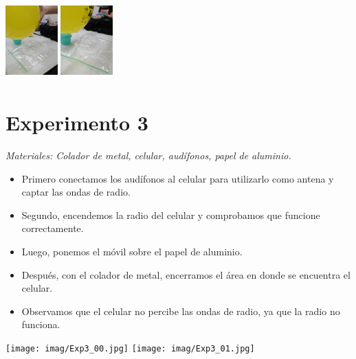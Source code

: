 \documentclass[]{article}
\newenvironment{Figura}
  {\par\medskip\noindent\minipage{\linewidth}}
  {\endminipage\par\medskip}
\begin{document}
\begin{multicols*}{2}
\begin{Figura}
    \centering
    \includegraphics[width=2cm, height=3cm]{imag/Exp2_03.jpg}
    \includegraphics[width=2cm, height=3cm]{imag/Exp2_04.jpg}
\end{Figura}   





    
\section*{Experimento 3}
\textit{Materiales: Colador de metal, celular, audífonos, papel de aluminio.}
\vspace{-\topsep}
    \begin{itemize}
       \setlength{\parskip}{0pt} 
       \setlength{\itemsep}{0pt plus 1pt}
        \item Primero conectamos los audífonos al celular para utilizarlo como antena y captar las ondas de radio.
        \item Segundo, encendemos la radio del celular y comprobamos que funcione correctamente.
        \item Luego, ponemos el móvil sobre el papel de aluminio.
        \item Después, con el colador de metal, encerramos el área en donde se encuentra el celular.
        \item Observamos que el celular no percibe las ondas de radio, ya que la radio no funciona.
    \end{itemize}
\vspace{-\topsep}

\begin{Figura}
    \centering
    \texttt{[image: imag/Exp3\_00.jpg]}
    \texttt{[image: imag/Exp3\_01.jpg]}
\end{Figura}



\end{multicols*}
\end{document}
